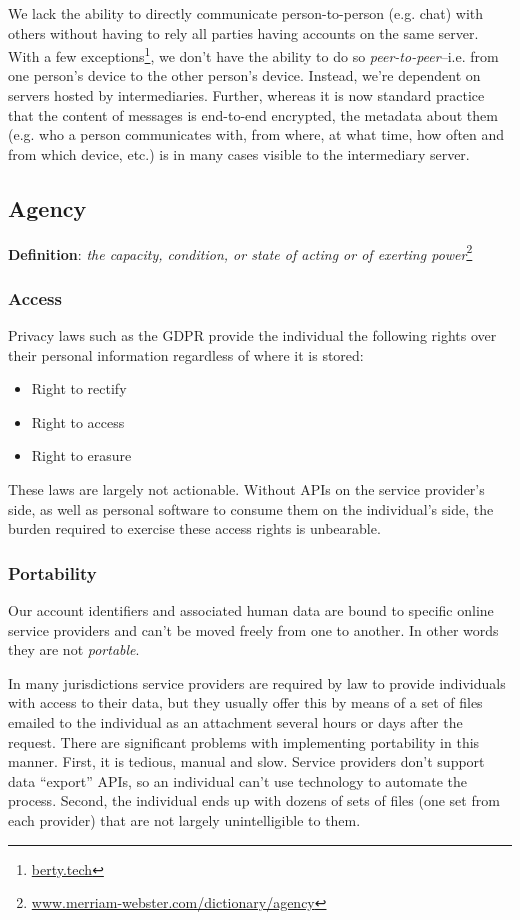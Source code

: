 \documentclass[11pt, oneside]{article}   	%
\newcommand{\hyperfootnote}[1][]{\def\ArgI{{#1}}\hyperfootnoteRelay}
\newcommand\hyperfootnoteRelay[2][]{\href{#1#2}{\ArgI}\footnote{\href{#1#2}{#2}}}
\begin{document}
We lack the ability to directly communicate person-to-person (e.g. chat) with others without having to rely all parties having accounts on the same server. With a few exceptions\hyperfootnote[][https://]{berty.tech}, we don't have the ability to do so \emph{peer-to-peer}--i.e. from one person's device to the other person's device. Instead, we're dependent on servers hosted by intermediaries. Further, whereas it is now standard practice that the content of messages is end-to-end encrypted, the metadata about them (e.g. who a person communicates with, from where, at what time, how often and from which device, etc.) is in many cases visible to the intermediary server.  

\subsection{Agency}

\textbf{Definition}: \emph{the capacity, condition, or state of acting or of exerting power}\hyperfootnote[][https://]{www.merriam-webster.com/dictionary/agency}

\subsubsection{Access}

Privacy laws such as the GDPR provide the individual the following rights over their personal information regardless of where it is stored:
\begin{itemize}
	\item Right to rectify
	\item Right to access
	\item Right to erasure
\end{itemize}

These laws are largely not actionable. Without APIs on the service provider's side, as well as personal software to consume them on the individual's side, the burden required to exercise these access rights is unbearable.

\subsubsection{Portability}

Our account identifiers and associated human data are bound to specific online service providers and can't be moved freely from one to another. In other words they are not \emph{portable}.

In many jurisdictions service providers are required by law to provide individuals with access to their data, but they usually offer this by means of a set of files emailed to the individual as an attachment several hours or days after the request. There are significant problems with implementing portability in this manner. First, it is tedious, manual and slow. Service providers don't support data ``export'' APIs, so an individual can't use technology to automate the process. Second, the individual ends up with dozens of sets of files (one set from each provider) that are not largely unintelligible to them. 
\end{document}
